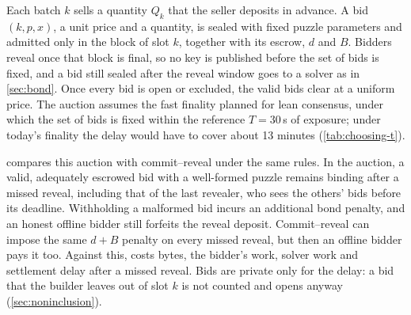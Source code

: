 Each batch $k$ sells a quantity $Q_k$ that the seller deposits in advance. A bid $(k, p, x)$, a unit price and a quantity, is sealed with fixed puzzle parameters and admitted only in the block of slot $k$, together with its escrow, $d$ and $B$. Bidders reveal once that block is final, so no key is published before the set of bids is fixed, and a bid still sealed after the reveal window goes to a solver as in \cref{sec:bond}. Once every bid is open or excluded, the valid bids clear at a uniform price. The auction assumes the fast finality planned for lean consensus, under which the set of bids is fixed within the reference $T = 30$\,s of exposure; under today's finality the delay would have to cover about 13 minutes (\cref{tab:choosing-t}).

 compares this auction with commit--reveal under the same rules. In the auction, a valid, adequately escrowed bid with a well-formed puzzle remains binding after a missed reveal, including that of the last revealer, who sees the others' bids before its deadline. Withholding a malformed bid incurs an additional bond penalty, and an honest offline bidder still forfeits the reveal deposit. Commit--reveal can impose the same $d + B$ penalty on every missed reveal, but then an offline bidder pays it too. Against this, \leanseal costs bytes, the bidder's work, solver work and settlement delay after a missed reveal. Bids are private only for the delay: a bid that the builder leaves out of slot $k$ is not counted and opens anyway (\cref{sec:noninclusion}).

